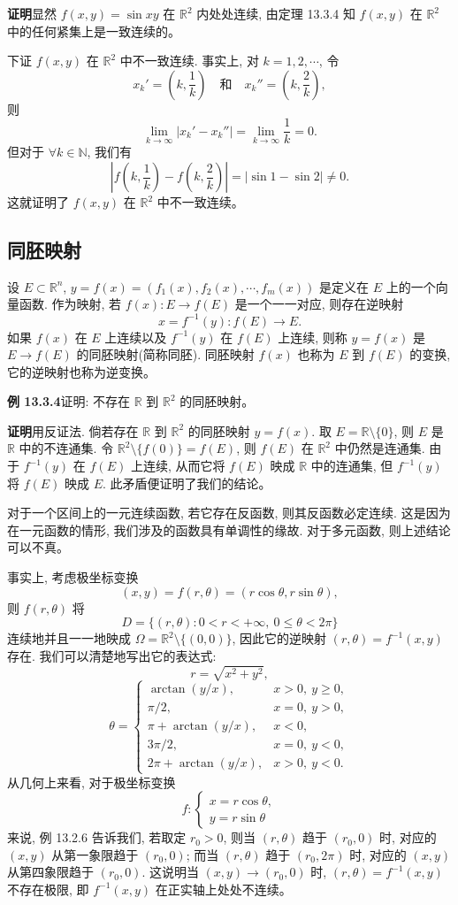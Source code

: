 \documentclass[UTF8,12pt,a4paper,fontset=fandol]{ctexart}
\begin{document}
\noindent\textbf{证明}\quad 显然 $f(x,y)=\sin xy$ 在 $\mathbb R^2$ 内处处连续, 由定理 13.3.4 知 $f(x,y)$ 在 $\mathbb R^2$ 中的任何紧集上是一致连续的。

下证 $f(x,y)$ 在 $\mathbb R^2$ 中不一致连续. 事实上, 对 $k=1,2,\cdots$, 令
\[
  x_k'=\left(k,\frac1k\right)\quad\text{和}\quad
  x_k''=\left(k,\frac2k\right),
\]
则
\[
  \lim_{k\to\infty}|x_k'-x_k''|=\lim_{k\to\infty}\frac1k=0.
\]
但对于 $\forall k\in\mathbb N$, 我们有
\[
  \left|f\left(k,\frac1k\right)-f\left(k,\frac2k\right)\right|
  =|\sin1-\sin2|\ne0.
\]
这就证明了 $f(x,y)$ 在 $\mathbb R^2$ 中不一致连续。

\subsection{同胚映射}

设 $E\subset\mathbb R^n$, $y=f(x)=(f_1(x),f_2(x),\cdots,f_m(x))$ 是定义在 $E$ 上的一个向量函数. 作为映射, 若 $f(x):E\to f(E)$ 是一个一一对应, 则存在逆映射
\[
  x=f^{-1}(y):f(E)\to E.
\]
如果 $f(x)$ 在 $E$ 上连续以及 $f^{-1}(y)$ 在 $f(E)$ 上连续, 则称 $y=f(x)$ 是 $E\to f(E)$ 的同胚映射(简称同胚). 同胚映射 $f(x)$ 也称为 $E$ 到 $f(E)$ 的变换, 它的逆映射也称为逆变换。

\noindent\textbf{例 13.3.4}\quad 证明: 不存在 $\mathbb R$ 到 $\mathbb R^2$ 的同胚映射。

\noindent\textbf{证明}\quad 用反证法. 倘若存在 $\mathbb R$ 到 $\mathbb R^2$ 的同胚映射 $y=f(x)$. 取 $E=\mathbb R\setminus\{0\}$, 则 $E$ 是 $\mathbb R$ 中的不连通集. 令 $\mathbb R^2\setminus\{f(0)\}=f(E)$, 则 $f(E)$ 在 $\mathbb R^2$ 中仍然是连通集. 由于 $f^{-1}(y)$ 在 $f(E)$ 上连续, 从而它将 $f(E)$ 映成 $\mathbb R$ 中的连通集, 但 $f^{-1}(y)$ 将 $f(E)$ 映成 $E$. 此矛盾便证明了我们的结论。

对于一个区间上的一元连续函数, 若它存在反函数, 则其反函数必定连续. 这是因为在一元函数的情形, 我们涉及的函数具有单调性的缘故. 对于多元函数, 则上述结论可以不真。

事实上, 考虑极坐标变换
\[
  (x,y)=f(r,\theta)=(r\cos\theta,r\sin\theta),
\]
则 $f(r,\theta)$ 将
\[
  D=\{(r,\theta):0<r<+\infty,\ 0\leqslant\theta<2\pi\}
\]
连续地并且一一地映成 $\Omega=\mathbb R^2\setminus\{(0,0)\}$, 因此它的逆映射 $(r,\theta)=f^{-1}(x,y)$ 存在. 我们可以清楚地写出它的表达式:
\[
  r=\sqrt{x^2+y^2},
\]
\[
  \theta=
  \begin{cases}
    \arctan(y/x), & x>0,\ y\geqslant0,\\
    \pi/2, & x=0,\ y>0,\\
    \pi+\arctan(y/x), & x<0,\\
    3\pi/2, & x=0,\ y<0,\\
    2\pi+\arctan(y/x), & x>0,\ y<0.
  \end{cases}
\]
从几何上来看, 对于极坐标变换
\[
  f:
  \begin{cases}
    x=r\cos\theta,\\
    y=r\sin\theta
  \end{cases}
\]
来说, 例 13.2.6 告诉我们, 若取定 $r_0>0$, 则当 $(r,\theta)$ 趋于 $(r_0,0)$ 时, 对应的 $(x,y)$ 从第一象限趋于 $(r_0,0)$; 而当 $(r,\theta)$ 趋于 $(r_0,2\pi)$ 时, 对应的 $(x,y)$ 从第四象限趋于 $(r_0,0)$. 这说明当 $(x,y)\to(r_0,0)$ 时, $(r,\theta)=f^{-1}(x,y)$ 不存在极限, 即 $f^{-1}(x,y)$ 在正实轴上处处不连续。
\end{document}
